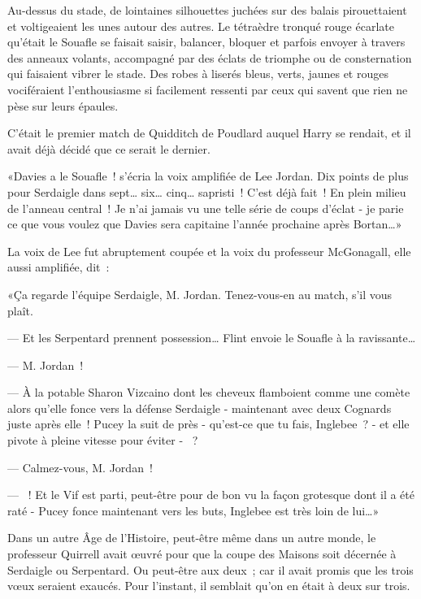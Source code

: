 \later

Au-dessus du stade, de lointaines silhouettes juchées sur des balais pirouettaient et voltigeaient les unes autour des autres. Le tétraèdre tronqué rouge écarlate qu'était le Souafle se faisait saisir, balancer, bloquer et parfois envoyer à travers des anneaux volants, accompagné par des éclats de triomphe ou de consternation qui faisaient vibrer le stade. Des robes à liserés bleus, verts, jaunes et rouges vociféraient l'enthousiasme si facilement ressenti par ceux qui savent que rien ne pèse sur leurs épaules.

C'était le premier match de Quidditch de Poudlard auquel Harry se rendait, et il avait déjà décidé que ce serait le dernier.

«Davies a le Souafle~! s'écria la voix amplifiée de Lee Jordan. Dix points de plus pour Serdaigle dans sept… six… cinq… sapristi~! C'est déjà fait~! En plein milieu de l'anneau central~! Je n'ai jamais vu une telle série de coups d'éclat - je parie ce que vous voulez que Davies sera capitaine l'année prochaine après Bortan…»

La voix de Lee fut abruptement coupée et la voix du professeur McGonagall, elle aussi amplifiée, dit~:

«Ça regarde l'équipe Serdaigle, M. Jordan. Tenez-vous-en au match, s'il vous plaît.

--- Et les Serpentard prennent possession… Flint envoie le Souafle à la ravissante…

--- M. Jordan~!

--- À la potable Sharon Vizcaino dont les cheveux flamboient comme une comète alors qu'elle fonce vers la défense Serdaigle - maintenant avec deux Cognards juste après elle~! Pucey la suit de près - qu'est-ce que tu fais, Inglebee~? - et elle pivote à pleine vitesse pour éviter - ~?

--- Calmez-vous, M. Jordan~!

--- ~! Et le Vif est parti, peut-être pour de bon vu la façon grotesque dont il a été raté - Pucey fonce maintenant vers les buts, Inglebee est très loin de lui…»

Dans un autre Âge de l'Histoire, peut-être même dans un autre monde, le professeur Quirrell avait œuvré pour que la coupe des Maisons soit décernée à Serdaigle ou Serpentard. Ou peut-être aux deux~; car il avait promis que les trois vœux seraient exaucés. Pour l'instant, il semblait qu'on en était à deux sur trois.

